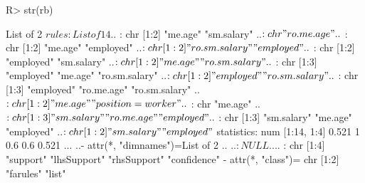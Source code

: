 \begin{Schunk}
% --begin: "searchrules2"
\begin{Sinput}
R> str(rb)
\end{Sinput}
\begin{Soutput}
List of 2
 $ rules     :List of 14
  ..$ : chr [1:2] "me.age" "sm.salary"
  ..$ : chr "ro.me.age"
  ..$ : chr [1:2] "me.age" "employed"
  ..$ : chr [1:2] "ro.sm.salary" "employed"
  ..$ : chr [1:2] "employed" "sm.salary"
  ..$ : chr [1:2] "me.age" "ro.sm.salary"
  ..$ : chr [1:3] "employed" "me.age" "ro.sm.salary"
  ..$ : chr [1:2] "employed" "ro.sm.salary"
  ..$ : chr [1:3] "employed" "ro.me.age" "ro.sm.salary"
  ..$ : chr [1:2] "me.age" "position=worker"
  ..$ : chr "me.age"
  ..$ : chr [1:3] "sm.salary" "ro.me.age" "employed"
  ..$ : chr [1:3] "sm.salary" "me.age" "employed"
  ..$ : chr [1:2] "sm.salary" "employed"
 $ statistics: num [1:14, 1:4] 0.521 1 0.6 0.6 0.521 ...
  ..- attr(*, "dimnames")=List of 2
  .. ..$ : NULL
  .. ..$ : chr [1:4] "support" "lhsSupport" "rhsSupport" "confidence"
 - attr(*, "class")= chr [1:2] "farules" "list"
\end{Soutput}
%
% --end: "searchrules2"
\end{Schunk}
